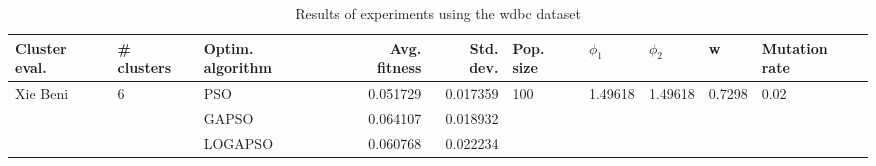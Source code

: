 \begin{table}
\centering
\caption{Results of experiments using the wdbc dataset}
\begin{tabular}{lllrrlllll}
\toprule
            Cluster eval. &        \# clusters & Optim. algorithm &  Avg. fitness &  Std. dev. &            Pop. size &               $\phi_{1}$ &               $\phi_{2}$ &                       w &         Mutation rate \\
\midrule
\multirow{3}{*}{Xie Beni} & \multirow{3}{*}{6} &              PSO &      0.051729 &   0.017359 & \multirow{3}{*}{100} & \multirow{3}{*}{1.49618} & \multirow{3}{*}{1.49618} & \multirow{3}{*}{0.7298} & \multirow{3}{*}{0.02} \\
                          &                    &            GAPSO &      0.064107 &   0.018932 &                      &                          &                          &                         &                       \\
                          &                    &          LOGAPSO &      0.060768 &   0.022234 &                      &                          &                          &                         &                       \\
\bottomrule
\end{tabular}
\end{table}
